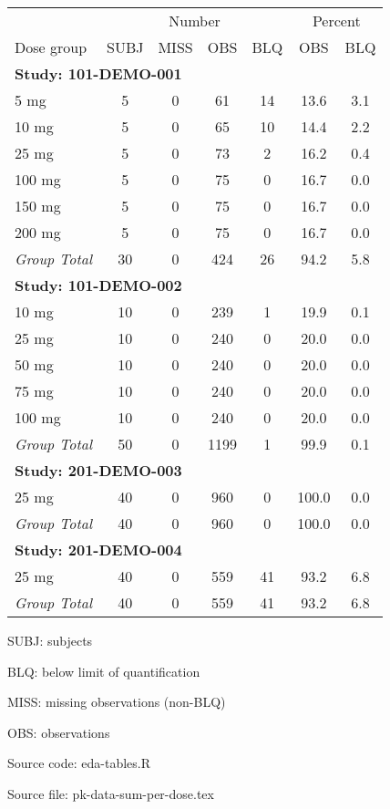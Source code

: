 \setlength{\tabcolsep}{5pt} 
\begin{threeparttable}
\renewcommand{\arraystretch}{1.3}
\begin{tabular}[h]{lcccccc}
\hline
\multicolumn{1}{c}{} & \multicolumn{4}{c}{Number} & \multicolumn{2}{c}{Percent} \\
\cmidrule(lr){2-5}
\cmidrule(lr){6-7}
Dose group & SUBJ & MISS & OBS & BLQ & OBS & BLQ \\
\hline
\multicolumn{7}{l}{\textbf{Study: 101-DEMO-001}}\\%
5 mg & 5 & 0 & 61 & 14 & 13.6 & 3.1 \\
10 mg & 5 & 0 & 65 & 10 & 14.4 & 2.2 \\
25 mg & 5 & 0 & 73 & 2 & 16.2 & 0.4 \\
100 mg & 5 & 0 & 75 & 0 & 16.7 & 0.0 \\
150 mg & 5 & 0 & 75 & 0 & 16.7 & 0.0 \\
200 mg & 5 & 0 & 75 & 0 & 16.7 & 0.0 \\
\hline {\it Group Total} & 30 & 0 & 424 & 26 & 94.2 & 5.8 \\
\hline \multicolumn{7}{l}{\textbf{Study: 101-DEMO-002}}\\%
10 mg & 10 & 0 & 239 & 1 & 19.9 & 0.1 \\
25 mg & 10 & 0 & 240 & 0 & 20.0 & 0.0 \\
50 mg & 10 & 0 & 240 & 0 & 20.0 & 0.0 \\
75 mg & 10 & 0 & 240 & 0 & 20.0 & 0.0 \\
100 mg & 10 & 0 & 240 & 0 & 20.0 & 0.0 \\
\hline {\it Group Total} & 50 & 0 & 1199 & 1 & 99.9 & 0.1 \\
\hline \multicolumn{7}{l}{\textbf{Study: 201-DEMO-003}}\\%
25 mg & 40 & 0 & 960 & 0 & 100.0 & 0.0 \\
\hline {\it Group Total} & 40 & 0 & 960 & 0 & 100.0 & 0.0 \\
\hline \multicolumn{7}{l}{\textbf{Study: 201-DEMO-004}}\\%
25 mg & 40 & 0 & 559 & 41 & 93.2 & 6.8 \\
\hline {\it Group Total} & 40 & 0 & 559 & 41 & 93.2 & 6.8 \\
\hline
\end{tabular}
\begin{tablenotes}[flushleft]
\item SUBJ: subjects
\item BLQ: below limit of quantification
\item MISS: missing observations (non-BLQ)
\item OBS: observations
\item Source code: eda-tables.R
\item Source file: pk-data-sum-per-dose.tex
\end{tablenotes}
\end{threeparttable}
